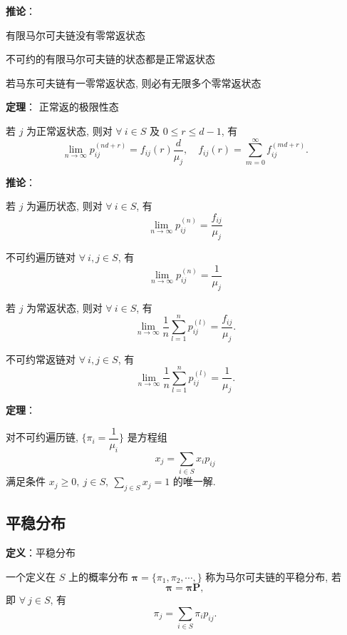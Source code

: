 \documentclass[openany]{ctexbook}
\theoremstyle{kaiti}
\theoremstyle{normal}
\begin{document}
\textbf{推论}：

有限马尔可夫链没有零常返状态

不可约的有限马尔可夫链的状态都是正常返状态

若马东可夫链有一零常返状态, 则必有无限多个零常返状态

\textbf{定理}： 正常返的极限性态

若 $j$ 为正常返状态, 则对 $\forall~i\in S$ 及 $0\leqslant r\leqslant d-1$, 有
\begin{equation}
  \lim_{n\to\infty}p_{ij}^{(nd+r)}=f_{ij}(r)\frac{d}{\mu_j},\quad f_{ij}(r)=\sum_{m=0}^\infty f_{ij}^{(md+r)}.
\end{equation}

\textbf{推论}：

若 $j$ 为遍历状态, 则对 $\forall~i\in S$, 有
\begin{equation}
  \lim_{n\to\infty}p_{ij}^{(n)}=\frac{f_{ij}}{\mu_j}
\end{equation}

不可约遍历链对 $\forall~i,j\in S$, 有
\begin{equation}
  \lim_{n\to\infty}p_{ij}^{(n)}=\frac{1}{\mu_j}
\end{equation}

若 $j$ 为常返状态, 则对 $\forall~i\in S$, 有
\begin{equation}
  \lim_{n\to\infty}\frac{1}{n}\sum_{l=1}^np_{ij}^{(l)}=\frac{f_{ij}}{\mu_j}.
\end{equation}

不可约常返链对 $\forall~i,j\in S$, 有
\begin{equation}
  \lim_{n\to\infty}\frac{1}{n}\sum_{l=1}^np_{ij}^{(l)}=\frac{1}{\mu_j}.
\end{equation}

\textbf{定理}：

对不可约遍历链, $\Big\{\pi_i=\dfrac{1}{\mu_i}\Big\}$ 是方程组
\begin{equation}
  x_j=\sum_{i\in S}x_ip_{ij}
\end{equation}
满足条件 $x_j\geqslant0,~j\in S,~\sum_{j\in S}x_j=1$ 的唯一解.

\subsection{平稳分布}

\textbf{定义}：平稳分布

一个定义在 $S$ 上的概率分布 $\bm{\pi}=\{\pi_1,\pi_2,\cdots,\}$ 称为马尔可夫链的平稳分布, 若
\begin{equation}
  \bm{\pi}=\bm{\pi}\bm{P},
\end{equation}
即 $\forall~j\in S$, 有
\begin{equation}
  \pi_j=\sum_{i\in S}\pi_ip_{ij}.
\end{equation}
\end{document}
